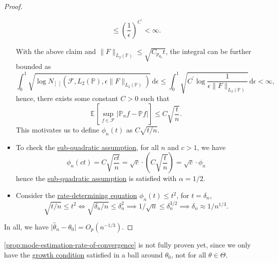 \begin{proof}
\begin{itemize}
\begin{claim}
\[				      \leq \left( \frac{1}{\epsilon } \right) ^{C^{\prime} } < \infty .
			      \]
		      \end{claim}
		      With the above claim and \(\lVert F \rVert _{L_2(\mathbb{P} )} \leq \sqrt{C_{p_{\theta _0}} t} \), the integral can be further bounded as
		      \[
			      \int_{0}^{1} \sqrt{\log N_{[\ ]}(\mathscr{F} , L_2(\mathbb{P} ), \epsilon \lVert F \rVert _{L_2(\mathbb{P} )})} \,\mathrm{d}\epsilon
			      \leq \int_{0}^{1} \sqrt{C^{\prime} \log \frac{1}{\epsilon \lVert F \rVert _{L_2(\mathbb{P} )}} } \,\mathrm{d}\epsilon
			      < \infty,
		      \]
		      hence, there exists some constant \(C> 0\) such that
		      \[
			      \mathbb{E}_{}\left[\sup _{f\in \mathscr{F} } \vert \mathbb{P} _n f - \mathbb{P} f \vert  \right]
			      \leq C \sqrt{\frac{t}{n}}.
		      \]
		      This motivates us to define \(\phi _n (t)\) as \(C \sqrt{t / n} \).
		\item To check the \hyperref[def:sub-quadratic-assumption]{sub-quadratic assumption}, for all \(n\) and \(c > 1\), we have
		      \[
			      \phi _n (ct)
			      = C \sqrt{\frac{ct}{n}}
			      = \sqrt{c} \cdot \left( C \sqrt{\frac{t}{n}} \right)
			      = \sqrt{c} \cdot \phi _n
		      \]
		      hence the \hyperref[def:sub-quadratic-assumption]{sub-quadratic assumption} is satisfied with \(\alpha = 1 / 2\).
		\item Consider the \hyperref[def:rate-determining-equation]{rate-determining equation} \(\phi _n(t) \leq t^2\), for \(t = \delta _n\),
		      \[
			      \sqrt{t / n} \leq t^2
			      \iff \sqrt{\delta _n / n} \leq \delta _n^2
			      \implies 1 / \sqrt{n} \leq \delta _n^{3 / 2}
			      \implies \delta _n \approx 1 / n^{1 / 3}.
		      \]
	\end{itemize}
	In all, we have \(\vert \hat{\theta} _n - \theta _0 \vert = O_p(n^{-1 / 3})\).
\end{proof}

\autoref{prop:mode-estimation-rate-of-convergence} is not fully proven yet, since we only have the \hyperref[def:growth-condition*]{growth condition} satisfied in a ball around \(\theta _0\), not for all \(\theta \in \Theta \).